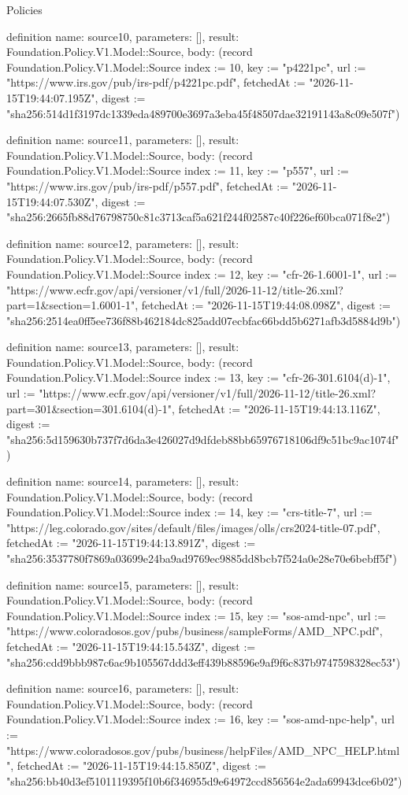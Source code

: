 \begin{lexlean}{Policies}
\begin{semanticmodule}
definition{
  name: source10,
  parameters: [],
  result: Foundation.Policy.V1.Model::Source,
  body: (record Foundation.Policy.V1.Model::Source {index := 10, key := "p4221pc", url := "https://www.irs.gov/pub/irs-pdf/p4221pc.pdf", fetchedAt := "2026-11-15T19:44:07.195Z", digest := "sha256:514d1f3197dc1339eda489700e3697a3eba45f48507dae32191143a8c09e507f"})
}

definition{
  name: source11,
  parameters: [],
  result: Foundation.Policy.V1.Model::Source,
  body: (record Foundation.Policy.V1.Model::Source {index := 11, key := "p557", url := "https://www.irs.gov/pub/irs-pdf/p557.pdf", fetchedAt := "2026-11-15T19:44:07.530Z", digest := "sha256:2665fb88d76798750c81c3713caf5a621f244f02587c40f226ef60bca071f8e2"})
}

definition{
  name: source12,
  parameters: [],
  result: Foundation.Policy.V1.Model::Source,
  body: (record Foundation.Policy.V1.Model::Source {index := 12, key := "cfr-26-1.6001-1", url := "https://www.ecfr.gov/api/versioner/v1/full/2026-11-12/title-26.xml?part=1&section=1.6001-1", fetchedAt := "2026-11-15T19:44:08.098Z", digest := "sha256:2514ea0ff5ee736f88b462184dc825add07ecbfac66bdd5b6271afb3d5884d9b"})
}

definition{
  name: source13,
  parameters: [],
  result: Foundation.Policy.V1.Model::Source,
  body: (record Foundation.Policy.V1.Model::Source {index := 13, key := "cfr-26-301.6104(d)-1", url := "https://www.ecfr.gov/api/versioner/v1/full/2026-11-12/title-26.xml?part=301&section=301.6104(d)-1", fetchedAt := "2026-11-15T19:44:13.116Z", digest := "sha256:5d159630b737f7d6da3e426027d9dfdeb88bb65976718106df9c51bc9ac1074f"})
}

definition{
  name: source14,
  parameters: [],
  result: Foundation.Policy.V1.Model::Source,
  body: (record Foundation.Policy.V1.Model::Source {index := 14, key := "crs-title-7", url := "https://leg.colorado.gov/sites/default/files/images/olls/crs2024-title-07.pdf", fetchedAt := "2026-11-15T19:44:13.891Z", digest := "sha256:3537780f7869a03699e24ba9ad9769ec9885dd8bcb7f524a0e28e70e6bebff5f"})
}

definition{
  name: source15,
  parameters: [],
  result: Foundation.Policy.V1.Model::Source,
  body: (record Foundation.Policy.V1.Model::Source {index := 15, key := "sos-amd-npc", url := "https://www.coloradosos.gov/pubs/business/sampleForms/AMD_NPC.pdf", fetchedAt := "2026-11-15T19:44:15.543Z", digest := "sha256:cdd9bbb987c6ac9b105567ddd3eff439b88596e9af9f6c837b9747598328ec53"})
}

definition{
  name: source16,
  parameters: [],
  result: Foundation.Policy.V1.Model::Source,
  body: (record Foundation.Policy.V1.Model::Source {index := 16, key := "sos-amd-npc-help", url := "https://www.coloradosos.gov/pubs/business/helpFiles/AMD_NPC_HELP.html", fetchedAt := "2026-11-15T19:44:15.850Z", digest := "sha256:bb40d3ef5101119395f10b6f346955d9e64972ccd856564e2ada69943dce6b02"})
}


\end{semanticmodule}
\end{lexlean}
